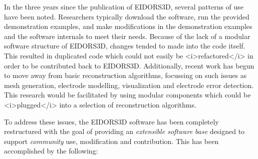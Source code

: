 \documentclass[12pt]{iopart}
\begin{document}
In the three years since the publication of EIDORS3D, several patterns
of use have been noted. Researchers typically download the software,
run the provided demonstration examples,  and 
make modifications in the demonstration examples and the software
internals to meet their needs.
Because of the lack of a modular software structure of EIDORS3D,
changes tended to made into the code itself. This resulted in
duplicated
code which could not easily be <i>refactored</i> in order to
be contributed back to EIDORS3D. Additionally, recent work has begun to move
away from basic reconstruction algorithms, focussing
on such issues as mesh generation, electrode modelling, visualization
and electrode error detection. This research would be facilitated
by using modular components which could be <i>plugged</i> into
a selection of reconstruction algorithms.

To address these issues, the EIDORS3D software has been completely
restructured with the goal of providing an {\em extensible software base}
designed to support {\em community} use, modification and contribution.
This has been accomplished by the following:
\end{document}

